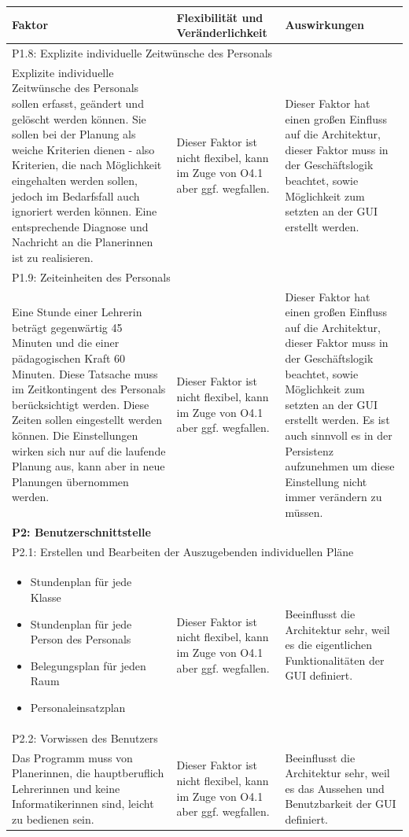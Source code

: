 \documentclass[fontsize=12pt,paper=a4,twoside]{scrartcl}
\begin{document}
\begin{tabularx}{\textwidth}{|X|X|X|}
\hline
\textbf{Faktor} & \textbf{Flexibilität und Veränderlichkeit} & \textbf{Auswirkungen}\\\hline
\hline
\hline
\multicolumn{3}{|l|}{P1.8: Explizite individuelle Zeitwünsche des Personals}\\\hline
Explizite individuelle Zeitwünsche des Personals sollen erfasst, geändert und gelöscht werden können. Sie sollen bei der Planung als weiche Kriterien dienen - also Kriterien, die nach Möglichkeit eingehalten werden sollen, jedoch im Bedarfsfall auch ignoriert werden können. Eine entsprechende Diagnose und Nachricht an die Planerinnen ist zu realisieren. & Dieser Faktor ist nicht flexibel, kann im Zuge von O4.1 aber ggf. wegfallen. & Dieser Faktor hat einen großen Einfluss auf die Architektur, dieser Faktor muss in der Geschäftslogik beachtet, sowie Möglichkeit zum setzten an der GUI erstellt werden. \\\hline
\multicolumn{3}{|l|}{P1.9: Zeiteinheiten des Personals}\\\hline
Eine Stunde einer Lehrerin beträgt gegenwärtig 45 Minuten und die einer pädagogischen Kraft 60 Minuten. Diese Tatsache muss im Zeitkontingent des Personals berücksichtigt werden. Diese Zeiten sollen eingestellt werden können. Die Einstellungen wirken sich nur auf die laufende Planung aus, kann aber in neue Planungen übernommen werden.& Dieser Faktor ist nicht flexibel, kann im Zuge von O4.1 aber ggf. wegfallen. & Dieser Faktor hat einen großen Einfluss auf die Architektur, dieser Faktor muss in der Geschäftslogik beachtet, sowie Möglichkeit zum setzten an der GUI erstellt werden. Es ist auch sinnvoll es in der Persistenz aufzunehmen um diese Einstellung nicht immer verändern zu müssen. \\\hline
\multicolumn{3}{|l|}{\textbf{P2: Benutzerschnittstelle}}\\\hline
\multicolumn{3}{|l|}{P2.1: Erstellen und Bearbeiten der Auszugebenden individuellen Pläne}\\\hline
\begin{itemize}[topsep=0cm, leftmargin=0.5cm, itemsep=0pt]
\item Stundenplan für jede Klasse
\item Stundenplan für jede Person des Personals
\item Belegungsplan für jeden Raum
\item Personaleinsatzplan 
\end{itemize} & Dieser Faktor ist nicht flexibel, kann im Zuge von O4.1 aber ggf. wegfallen. & Beeinflusst die Architektur sehr, weil es die eigentlichen Funktionalitäten der GUI definiert.
\\\hline
\multicolumn{3}{|l|}{P2.2: Vorwissen des Benutzers}\\\hline
Das Programm muss von Planerinnen, die hauptberuflich Lehrerinnen und keine Informatikerinnen sind, leicht zu bedienen sein. & Dieser Faktor ist nicht flexibel, kann im Zuge von O4.1 aber ggf. wegfallen. & Beeinflusst die Architektur sehr, weil es das Aussehen und Benutzbarkeit der GUI definiert.
\\\hline
\end{tabularx}\\
\end{document}
